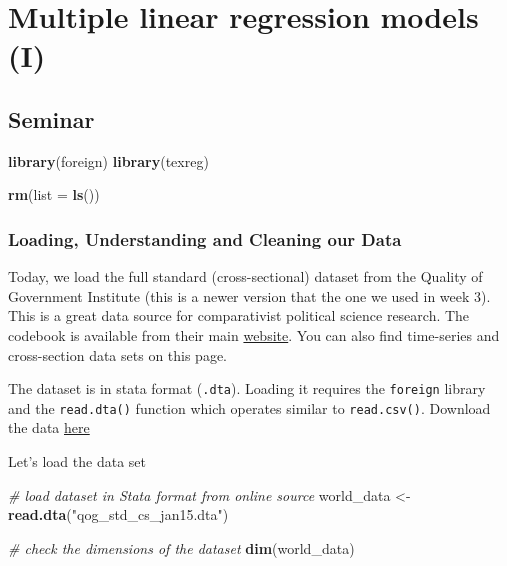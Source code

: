 \documentclass[]{article}
\newenvironment{Shaded}{\begin{snugshade}}{\end{snugshade}}
\newcommand{\KeywordTok}[1]{\textcolor[rgb]{0.13,0.29,0.53}{\textbf{#1}}}
\newcommand{\DataTypeTok}[1]{\textcolor[rgb]{0.13,0.29,0.53}{#1}}
\newcommand{\StringTok}[1]{\textcolor[rgb]{0.31,0.60,0.02}{#1}}
\newcommand{\CommentTok}[1]{\textcolor[rgb]{0.56,0.35,0.01}{\textit{#1}}}
\newcommand{\NormalTok}[1]{#1}
\theoremstyle{definition}
\theoremstyle{definition}
\theoremstyle{definition}
\theoremstyle{remark}
\begin{document}
\section{Multiple linear regression models
(I)}\label{multiple-linear-regression-models-i}

\subsection{Seminar}\label{seminar-6}

\begin{Shaded}
\begin{Highlighting}[]
\KeywordTok{library}\NormalTok{(foreign) }
\KeywordTok{library}\NormalTok{(texreg)}
\end{Highlighting}
\end{Shaded}

\begin{Shaded}
\begin{Highlighting}[]
\KeywordTok{rm}\NormalTok{(}\DataTypeTok{list =} \KeywordTok{ls}\NormalTok{())}
\end{Highlighting}
\end{Shaded}

\subsubsection{Loading, Understanding and Cleaning our
Data}\label{loading-understanding-and-cleaning-our-data}

Today, we load the full standard (cross-sectional) dataset from the
Quality of Government Institute (this is a newer version that the one we
used in week 3). This is a great data source for comparativist political
science research. The codebook is available from their main
\href{http://qog.pol.gu.se/data/datadownloads/qogstandarddata}{website}.
You can also find time-series and cross-section data sets on this page.

The dataset is in stata format (\texttt{.dta}). Loading it requires the
\texttt{foreign} library and the \texttt{read.dta()} function which
operates similar to \texttt{read.csv()}. Download the data
\href{https://github.com/philippbroniecki/statistics1/blob/master/data/qog_std_cs_jan15.dta?raw=TRUE}{here}

Let's load the data set

\begin{Shaded}
\begin{Highlighting}[]
\CommentTok{# load dataset in Stata format from online source}
\NormalTok{world_data <-}\StringTok{ }\KeywordTok{read.dta}\NormalTok{(}\StringTok{"qog_std_cs_jan15.dta"}\NormalTok{)}

\CommentTok{# check the dimensions of the dataset}
\KeywordTok{dim}\NormalTok{(world_data)}
\end{Highlighting}
\end{Shaded}
\end{document}
